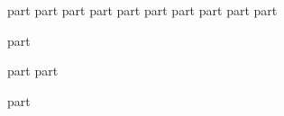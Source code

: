 {part}
{part}
{part}
{part}
{part}
{part}
{part}
{part}
{part}
{part}

{part}

 {part}
 {part}

\backmatter
{part}
